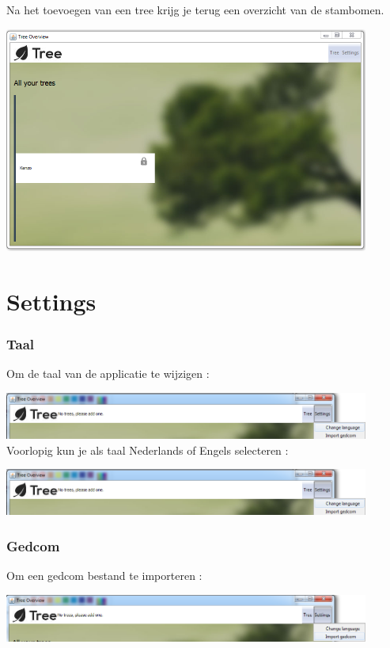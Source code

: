 \documentclass[pdftex,a4paper,12pt,twoside]{report}
\begin{document}
Na het toevoegen van een tree krijg je terug een overzicht van de stambomen.

\includegraphics[width=12cm]{images/user_treeoverview_full.png}\\[.5cm]

\chapter{Settings}
\subsection{Taal}
Om de taal van de applicatie te wijzigen :

\includegraphics[width=12cm]{images/change_language.png}\\[.5cm]

Voorlopig kun je als taal Nederlands of Engels selecteren :

\includegraphics[width=12cm]{images/change_language.png}\\[.5cm]

\subsection{Gedcom}
Om een gedcom bestand te importeren :

\includegraphics[width=12cm]{images/import_gedcom.png}\\[.5cm]
\end{document}
